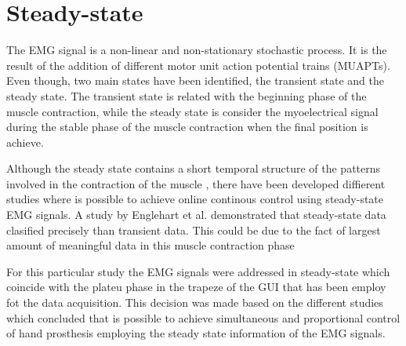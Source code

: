 \section{Steady-state}

The EMG signal is a non-linear and non-stationary stochastic process. It is the result of the addition of different motor unit action potential trains  (MUAPTs). Even though, two main states have been identified, the transient state and the steady state. The transient state is related with the beginning phase of the muscle contraction, while the steady state is consider the myoelectrical signal during the stable phase of the muscle contraction when the final position is achieve. \cite{mobarak2014}

Although the steady state contains a short temporal structure of the patterns involved in the contraction of the muscle \cite{mobarak}, there have been developed diffierent studies where is possible to achieve online continous control using steady-state EMG signals. A study by Englehart et al. \cite{} demonstrated that steady-state data clasified precisely than transient data. This could be due to the fact of largest amount of meaningful data in this muscle contraction phase \cite{mobarak}  %

For this particular study the EMG signals were addressed in steady-state which coincide with the plateu phase in the trapeze of the GUI that has been employ fot the data acquisition. This decision was made based on the different studies which concluded that is possible to achieve simultaneous and proportional control of hand prosthesis employing the steady state information of the EMG signals.

